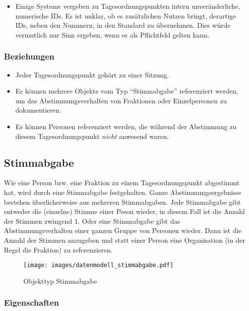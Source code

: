 \documentclass[,a4paper]{article}
\makeatletter
\def\maxwidth{\ifdim\Gin@nat@width>\linewidth\linewidth
\else\Gin@nat@width\fi}
\let\Oldincludegraphics\includegraphics
\renewcommand{\includegraphics}[1]{\Oldincludegraphics[width=\maxwidth]{#1}}
\makeatother
\begin{document}
\begin{itemize}
\item
  Einige Systeme vergeben zu Tagesordnungspunkten intern
  unveränderliche, numerische IDs. Es ist unklar, ob es zusätzlichen
  Nutzen bringt, derartige IDs, neben den Nummern, in den Standard zu
  übernehmen. Dies würde vermutlich nur Sinn ergeben, wenn es als
  Pflichtfeld gelten kann.
\end{itemize}

\subsubsection{Beziehungen}

\begin{itemize}
\item
  Jeder Tagesordnungspunkt gehört zu einer Sitzung.
\item
  Es können mehrere Objekte vom Typ ``Stimmabgabe'' referenziert werden,
  um das Abstimmungsverhalten von Fraktionen oder Einzelpersonen zu
  dokumentieren.
\item
  Es können Personen referenziert werden, die während der Abstimmung zu
  diesem Tagesordnungspunkt \emph{nicht} anwesend waren.
\end{itemize}

\subsection{Stimmabgabe}

Wie eine Person bzw. eine Fraktion zu einem Tagesordnungspunkt
abgestimmt hat, wird durch eine Stimmabgabe festgehalten. Ganze
Abstimmungsergebnisse bestehen überlicherweise aus mehreren
Stimmabgaben. Jede Stimmabgabe gibt entweder die (einzelne) Stimme einer
Peson wieder, in diesem Fall ist die Anzahl der Stimmen zwingend 1. Oder
eine Stimmabgabe gibt das Abstimmungsverhalten einer ganzen Gruppe von
Personen wieder. Dann ist die Anzahl der Stimmen anzugeben und statt
einer Person eine Organisation (in der Regel die Fraktion) zu
referenzieren.

\begin{figure}[htbp]
\centering
\texttt{[image: images/datenmodell\_stimmabgabe.pdf]}
\caption{Objekttyp Stimmabgabe}
\end{figure}

\subsubsection{Eigenschaften}
\end{document}
